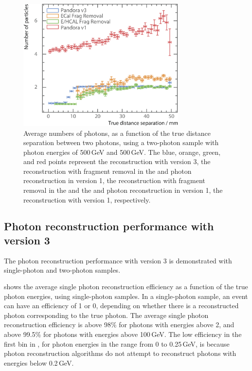 \begin{figure}[tbph]
\centering
\includegraphics[width=0.75\textwidth]{photon/DoubleCompareAlg4}
\caption[Average number of photons, as a function of the MC distance separation for different algorithms combinations.]
{Average numbers of photons, as a function of the true distance separation between two photons, using a two-photon sample with photon energies of  500\,GeV and 500\,GeV. The blue, orange, green, and red points represent the reconstruction with \pandora version 3, the reconstruction with fragment removal in the \ECAL and photon reconstruction in  \pandora version 1,  the reconstruction with fragment removal in the \ECAL and the \HCAL and photon reconstruction in  \pandora version 1, the reconstruction with \pandora version 1, respectively.}
\label{fig:photonDoubleCompareAlgs}
\end{figure}

\subsection{Photon reconstruction performance with \pandora version 3}

The photon reconstruction performance with \pandora version 3 is demonstrated with  single-photon and  two-photon samples.

 shows the average single photon reconstruction  efficiency as a function of the true photon energies, using single-photon samples.  In a single-photon sample, an event can have an efficiency of 1 or 0, depending on whether there is a reconstructed photon  corresponding to the true photon. The average single photon reconstruction efficiency is above 98\% for photons with energies above 2\GeV, and above 99.5\% for photons  with energies  above 100\,GeV.  The low efficiency in the first bin in , for photon energies in the range from 0 to 0.25\,GeV, is because photon reconstruction algorithms do not attempt to reconstruct photons with energies below 0.2\,GeV.

